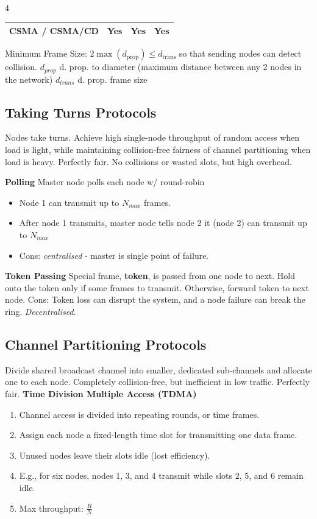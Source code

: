 \documentclass[10pt]{extarticle}
\begin{document}
\begin{multicols}{4}
\begin{center}
{\begin{tabular}{lccc}
    CSMA / CSMA/CD
    & Yes
    & Yes
    & Yes \\
    \hline
  \end{tabular}%
}
\end{center}

Minimum Frame Size: $2\max\left(d_{\mathrm{prop}}\right) \leq d_{\mathrm{trans}}$ so that sending nodes can detect collision.
$d_{prop}$ d. prop. to diameter (maximum distance between any 2 nodes in the network)
$d_{trans}$ d. prop. frame size

\subsection{Taking Turns Protocols}
Nodes take turns. Achieve high single-node throughput of random access when load is light, while maintaining collision-free fairness
of channel partitioning when load is heavy. Perfectly fair. No collisions or wasted slots, but high overhead.

\textbf{Polling}
Master node polls each node w/ round-robin
\begin{itemize}
\item Node 1 can transmit up to $N_{max}$ frames.
\item After node 1 transmits, master node tells node 2 it (node 2) can transmit up to $N_{max}$
\item Cons: \textit{centralised} - master is single point of failure.
\end{itemize}

\textbf{Token Passing}
Special frame, \textbf{token}, is passed from one node to
next. Hold onto the token only if some frames to transmit. Otherwise, forward token
to next node. Cons: Token loss can disrupt the system, and a node failure can break the ring. \textit{Decentralised}.

\subsection{Channel Partitioning Protocols}
Divide shared broadcast channel into smaller, dedicated sub-channels and allocate one to each node. Completely collision-free, but inefficient in low traffic. Perfectly fair.
\textbf{Time Division Multiple Access (TDMA)}
\begin{enumerate}
\item Channel access is divided into repeating rounds, or time frames.
\item Assign each node a fixed-length time slot for transmitting one data frame.
\item Unused nodes leave their slots idle (lost efficiency).
\item E.g., for six nodes, nodes 1, 3, and 4 transmit while slots 2, 5, and 6 remain idle.
\item Max throughput: $\tfrac{R}{N}$
\end{enumerate}


\end{multicols}
\end{document}
